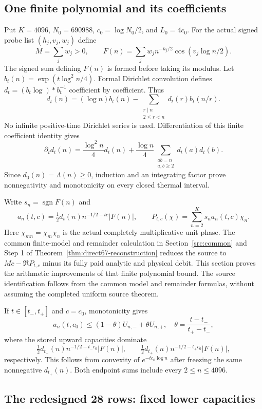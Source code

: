 \documentclass[11pt,a4paper]{article}
\theoremstyle{definition}
\theoremstyle{remark}
\begin{document}
\subsection{One finite polynomial and its coefficients}

Put $K=4096$, $N_0=690988$, $c_0=\log N_0/2$, and $L_0=4c_0$.
For the actual signed probe list $(h_j,v_j,w_j)$ define
\[
 M=\sum_jw_j>0,\qquad
 F(n)=\sum_j w_jn^{-h_j/2}\cos(v_j\log n/2).
\]
The signed sum defining $F(n)$ is formed before taking its modulus.
Let $b_t(n)=\exp(t\log^2n/4)$. Formal Dirichlet convolution defines
$d_t=(b_t\log)*b_t^{-1}$ coefficient by coefficient. Thus
\[
 d_t(n)=(\log n)b_t(n)
       -\sum_{\substack{r\mid n\\2\le r<n}}d_t(r)b_t(n/r).
\]
No infinite positive-time Dirichlet series is used. Differentiation of
this finite coefficient identity gives
\[
 \partial_td_t(n)=\frac{\log^2n}{4}d_t(n)
  +\frac{\log n}{4}\sum_{\substack{ab=n\\a,b\ge2}}d_t(a)d_t(b).
\]
Since $d_0(n)=\Lambda(n)\ge0$, induction and an integrating factor prove
nonnegativity and monotonicity on every closed thermal interval.

Write $s_n=\operatorname{sgn}F(n)$ and
\[
 a_n(t,c)=\tfrac12d_t(n)n^{-1/2-tc}|F(n)|,\qquad
 P_{t,c}(\chi)=\sum_{n=2}^{K}s_na_n(t,c)\chi_n.
\]
Here $\chi_{mn}=\chi_m\chi_n$ is the actual completely multiplicative
unit phase. The common finite-model and remainder calculation in
Section~\ref{src:common} and Step 1 of Theorem~\ref{thm:direct67-reconstruction}
reduces the source to $Mc-\Re P_{t,c}$ minus its fully paid analytic and
physical debit. This section proves the arithmetic improvements of
that finite polynomial bound. The source identification follows from
the common model and remainder formulas, without assuming the completed
uniform source theorem.

If $t\in[t_-,t_+]$ and $c=c_0$, monotonicity gives
\[
 a_n(t,c_0)\le(1-\theta)U_{n,-}+\theta U_{n,+},\quad
 \theta=\frac{t-t_-}{t_+-t_-},
\]
where the stored upward capacities dominate
\[
 \tfrac12d_{t_+}(n)n^{-1/2-t_-c_0}|F(n)|,
 \qquad
 \tfrac12d_{t_+}(n)n^{-1/2-t_+c_0}|F(n)|,
\]
respectively. This follows from convexity of $e^{-tc_0\log n}$ after
freezing the same nonnegative $d_{t_+}(n)$. Both endpoint sums include
every $2\le n\le4096$.

\subsection{The redesigned 28 rows: fixed lower capacities}
\end{document}
